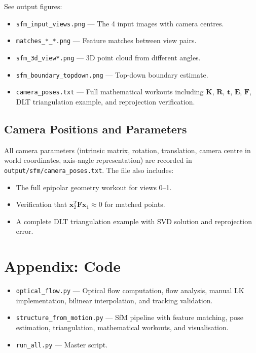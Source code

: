 \documentclass[12pt, a4paper]{article}
\begin{document}
See output figures:
\begin{itemize}
  \item \texttt{sfm\_input\_views.png} --- The 4 input images with camera centres.
  \item \texttt{matches\_*\_*.png} --- Feature matches between view pairs.
  \item \texttt{sfm\_3d\_view*.png} --- 3D point cloud from different angles.
  \item \texttt{sfm\_boundary\_topdown.png} --- Top-down boundary estimate.
  \item \texttt{camera\_poses.txt} --- Full mathematical workouts including $\mathbf{K}$, $\mathbf{R}$, $\mathbf{t}$, $\mathbf{E}$, $\mathbf{F}$, DLT triangulation example, and reprojection verification.
\end{itemize}

\subsection{Camera Positions and Parameters}

All camera parameters (intrinsic matrix, rotation, translation, camera centre in world coordinates, axis-angle representation) are recorded in \texttt{output/sfm/camera\_poses.txt}.  The file also includes:
\begin{itemize}
  \item The full epipolar geometry workout for views 0--1.
  \item Verification that $\mathbf{x}_2^T \mathbf{F} \mathbf{x}_1 \approx 0$ for matched points.
  \item A complete DLT triangulation example with SVD solution and reprojection error.
\end{itemize}

\newpage
\section{Appendix: Code}

\begin{itemize}
  \item \texttt{optical\_flow.py} --- Optical flow computation, flow analysis, manual LK implementation, bilinear interpolation, and tracking validation.
  \item \texttt{structure\_from\_motion.py} --- SfM pipeline with feature matching, pose estimation, triangulation, mathematical workouts, and visualisation.
  \item \texttt{run\_all.py} --- Master script.
\end{itemize}
\end{document}
